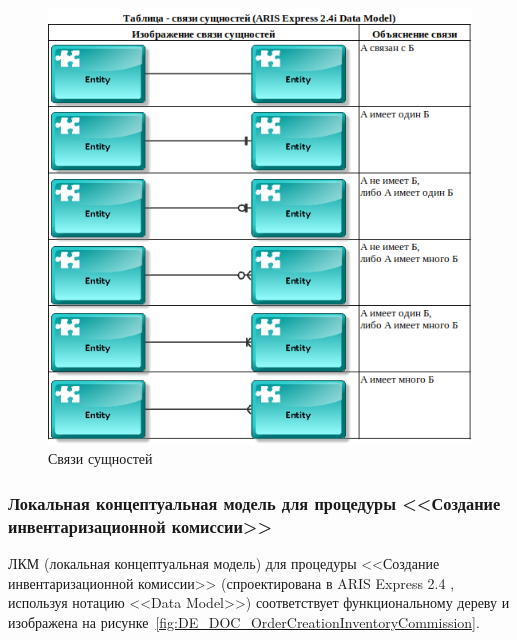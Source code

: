 \begin{figure}[!h]
    \centering

    \includegraphics[width=17cm]
    {assets/ARIS/DataModel/Relations/ArisDataModelRelations.png}

    \caption{Связи сущностей}

    \label{fig:ArisDataModelRelations}
\end{figure}

\subsubsection*{Локальная концептуальная модель для процедуры <<Создание инвентаризационной комиссии>>}

ЛКМ (локальная концептуальная модель)
для процедуры <<Создание инвентаризационной комиссии>>
(спроектирована в ARIS Express 2.4 \cite{ArisExpress}, используя нотацию <<Data Model>>)
соответствует функциональному дереву
и изображена на рисунке~\ref{fig:DE_DOC_OrderCreationInventoryCommission}.

